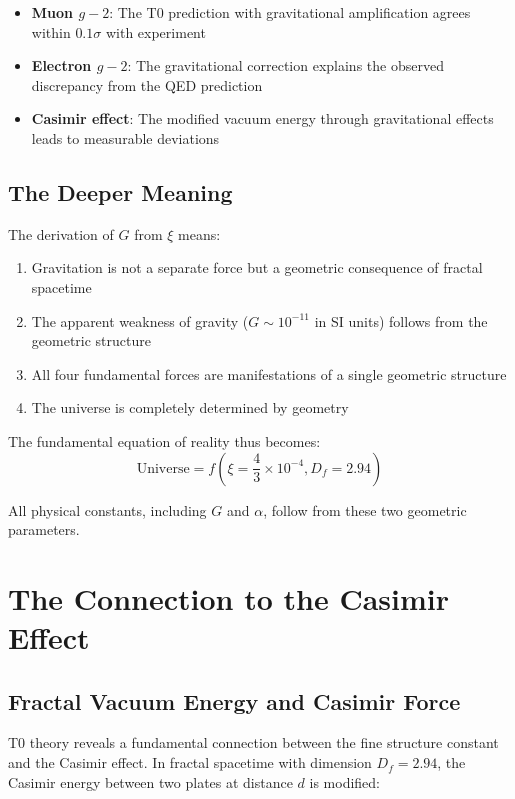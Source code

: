 \documentclass[12pt,a4paper]{article}
\theoremstyle{definition}
\begin{document}
	\begin{itemize}
		\item \textbf{Muon $g-2$}: The T0 prediction with gravitational amplification agrees within $0.1\sigma$ with experiment
		\item \textbf{Electron $g-2$}: The gravitational correction explains the observed discrepancy from the QED prediction
		\item \textbf{Casimir effect}: The modified vacuum energy through gravitational effects leads to measurable deviations
	\end{itemize}
	
	\subsection{The Deeper Meaning}
	
	The derivation of $G$ from $\xi$ means:
	
	\begin{enumerate}
		\item Gravitation is not a separate force but a geometric consequence of fractal spacetime
		\item The apparent weakness of gravity ($G \sim 10^{-11}$ in SI units) follows from the geometric structure
		\item All four fundamental forces are manifestations of a single geometric structure
		\item The universe is completely determined by geometry
	\end{enumerate}
	
	The fundamental equation of reality thus becomes:
	\begin{equation}
		\boxed{\text{Universe} = f\left(\xi = \frac{4}{3} \times 10^{-4}, D_f = 2.94\right)}
	\end{equation}
	
	All physical constants, including $G$ and $\alpha$, follow from these two geometric parameters.
	
	\section{The Connection to the Casimir Effect}
	
	\subsection{Fractal Vacuum Energy and Casimir Force}
	
	T0 theory reveals a fundamental connection between the fine structure constant and the Casimir effect. In fractal spacetime with dimension $D_f = 2.94$, the Casimir energy between two plates at distance $d$ is modified:
	
\end{document}

